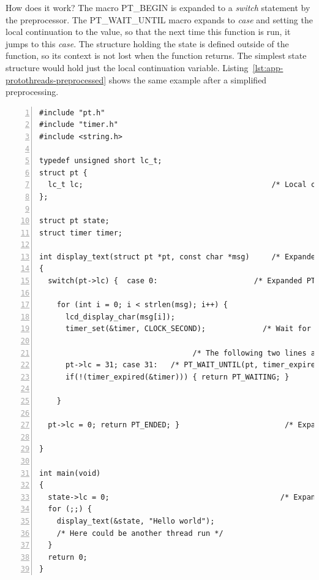 How does it work? The macro PT\_BEGIN is expanded to a {\it switch} statement
by the preprocessor.
The PT\_WAIT\_UNTIL macro expands to {\it case} and setting the local continuation
to the value, so that the next time this function is run, it jumps to this {\it case}.
The structure holding the state is defined outside of the function, so its context is not lost when
the function returns. The simplest state structure would hold just the local continuation variable.
Listing~\ref{lst:app-protothreads-preprocessed} shows
the same example after a simplified preprocessing.
\begin{lstlisting}[numbers=left,caption={Preprocessed example using Protothreads},label=lst:app-protothreads-preprocessed]
#include "pt.h"
#include "timer.h"
#include <string.h>

typedef unsigned short lc_t;
struct pt {
  lc_t lc;                                           /* Local continuation */
};

struct pt state;
struct timer timer;

int display_text(struct pt *pt, const char *msg)     /* Expanded PT_THREAD */
{
  switch(pt->lc) {  case 0:                      /* Expanded PT_BEGIN(pt); */

    for (int i = 0; i < strlen(msg); i++) {
      lcd_display_char(msg[i]);
      timer_set(&timer, CLOCK_SECOND);             /* Wait for one second. */

                                   /* The following two lines are expanded */
      pt->lc = 31; case 31:   /* PT_WAIT_UNTIL(pt, timer_expired(&timer)); */
      if(!(timer_expired(&timer))) { return PT_WAITING; }         /* macro */

    }

  pt->lc = 0; return PT_ENDED; }                        /* Expanded PT_END */

}

int main(void)
{
  state->lc = 0;                                       /* Expanded PT_INIT */
  for (;;) {
    display_text(&state, "Hello world");
    /* Here could be another thread run */
  }
  return 0;
}
\end{lstlisting}


